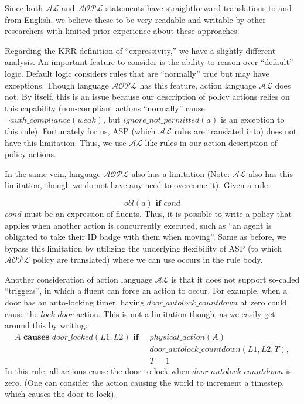 Since both $\mathcal{AL}$ and $\mathcal{AOPL}$ statements have straightforward translations to and from English, we believe these to be very readable and writable by other researchers with limited prior experience about these approaches.

Regarding the KRR definition of ``expressivity,'' we have a slightly different analysis.
An important feature to consider is the ability to reason over ``default'' logic.
Default logic considers rules that are ``normally'' true but may have exceptions.
Though language $\mathcal{AOPL}$ has this feature, action language $\mathcal{AL}$ does not.
By itself, this is an issue because our description of policy actions relies on this capability (non-compliant actions ``normally'' cause $\neg auth\_compliance(weak)$, but $ignore\_not\_permitted(a)$ is an exception to this rule).
Fortunately for us, ASP (which $\mathcal{AL}$ rules are translated into) does not have this limitation.
Thus, we use $\mathcal{AL}$-like rules in our action description of policy actions.

In the same vein, language $\mathcal{AOPL}$ also has a limitation (Note: $\mathcal{AL}$ also has this limitation, though we do not have any need to overcome it).
Given a rule:

\begin{equation}
    obl(a) \textbf{ if } cond
\end{equation}
$cond$ must be an expression of fluents.
Thus, it is possible to write a policy that applies when another action is concurrently executed, such as ``an agent is obligated to take their ID badge with them when moving''.
Same as before, we bypass this limitation by utilizing the underlying flexibility of ASP (to which $\mathcal{AOPL}$ policy are translated) where we can use occurs in the rule body.

Another consideration of action language $\mathcal{AL}$ is that it does not support so-called ``triggers'', in which a fluent can force an action to occur.
For example, when a door has an auto-locking timer, having $door\_autolock\_countdown$ at zero could cause the $lock\_door$ action.
This is not a limitation though, as we easily get around this by writing:
\begin{equation}
\begin{split}
    A \textbf{ causes } door\_locked(L1, L2) \textbf{ if } \
        & physical\_action(A) \\
        & door\_autolock\_countdown(L1, L2, T), \\
        & T = 1
\end{split}
\end{equation}
In this rule, all actions cause the door to lock when $door\_autolock\_countdown$ is zero.
(One can consider the action causing the world to increment a timestep, which causes the door to lock).

